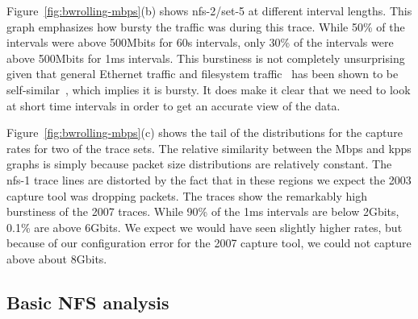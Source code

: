 Figure~\ref{fig:bwrolling-mbps}(b) shows nfs-2/set-5 at different
interval lengths.  This graph emphasizes how bursty the traffic was
during this trace. While 50\% of the intervals were above 500Mbits for
60s intervals, only 30\% of the intervals were above 500Mbits for 1ms
intervals.  This burstiness is not completely unsurprising given that
general Ethernet traffic and filesystem
traffic~\cite{Gribble98selfsimilar} has been shown to be
self-similar~\cite{Leland94selfsimilar}, which implies it is bursty.
It does make it clear that we need to look at short time intervals in
order to get an accurate view of the data.

Figure~\ref{fig:bwrolling-mbps}(c) shows the tail of the distributions for
the capture rates for two of the trace sets.  The relative similarity
between the Mbps and kpps graphs is simply because packet size
distributions are relatively constant.  The nfs-1 trace lines are
distorted by the fact that in these regions we expect the 2003 capture
tool was dropping packets.  The traces show the remarkably high
burstiness of the 2007 traces.  While 90\% of the 1ms intervals are
below 2Gbits, 0.1\% are above 6Gbits.  We expect we would have seen
slightly higher rates, but because of our configuration error for the
2007 capture tool, we could not capture above about 8Gbits.

\begin{figure*}
\caption{Bandwidth measured in the collection process}
\label{fig:bwrolling-mbps}
\end{figure*}


\subsection{Basic NFS analysis}



